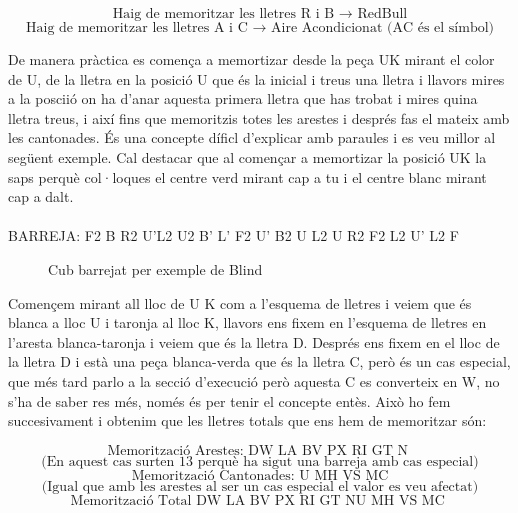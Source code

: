 $$ \textrm{Haig de memoritzar les lletres R i B    }  \rightarrow \textrm{   RedBull} $$
$$ \textrm{Haig de memoritzar les lletres A i C   }  \rightarrow \textrm{   Aire Acondicionat (AC és el símbol)} $$

\vspace{0.33cm}

De manera pràctica es comença a memortizar desde la peça UK mirant el color de U, de la lletra en la posició U que és la inicial i treus una lletra i llavors mires a la posciió on ha d'anar aquesta primera lletra que has trobat i mires quina lletra treus, i així fins que memoritzis totes les arestes i després fas el mateix amb les cantonades. És una concepte díficl d'explicar amb paraules i es veu millor al següent exemple. Cal destacar que al començar a memortizar la posició UK la saps perquè col·loques el centre verd mirant cap a tu i el centre blanc mirant cap a dalt.
\\\\BARREJA: F2 B R2 U'L2 U2 B' L' F2 U' B2 U L2 U R2 F2 L2 U' L2 F

\begin{figure}[h!]
    \centering\RubikCubeSolvedWY
    \caption{Cub barrejat per exemple de Blind}
    \label{exemple-memo}
    \end{figure}

Començem mirant all lloc de U K com a l'esquema de lletres i veiem que és blanca a lloc U i taronja al lloc K, llavors ens fixem en l'esquema de lletres en l'aresta blanca-taronja i veiem que és la lletra D. 
Després ens fixem en el lloc de la lletra D i està una peça blanca-verda que és la lletra C, però és un cas especial, que més tard parlo a la secció d'execució però aquesta C es converteix en W, no s'ha de saber res més, només és per tenir el concepte entès. Això ho fem succesivament i obtenim que les lletres totals que ens hem de memoritzar són:

$$ \textrm{Memorització Arestes: DW LA BV PX RI GT N } $$ $$ \textrm{(En aquest cas surten 13 perquè ha sigut una barreja amb cas especial)} $$
$$ \textrm{Memorització Cantonades: U MH VS MC} $$ $$ \textrm{(Igual que amb les arestes al ser un cas especial el valor es veu afectat)} $$
\vspace{0.17cm}
$$ \textrm{Memorització Total DW LA BV PX RI GT NU MH VS MC } $$

